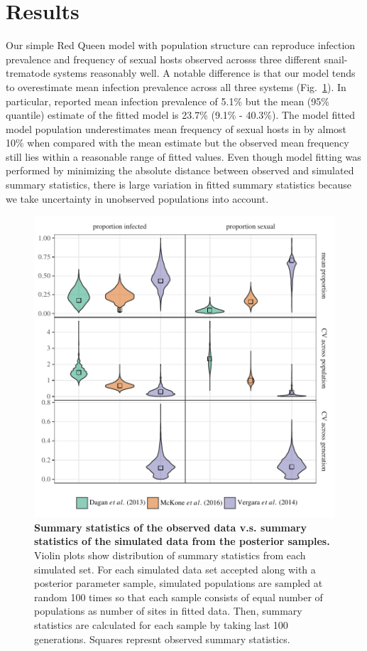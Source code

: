 \documentclass{article}\usepackage[]{graphicx}\usepackage[]{color}
\newcommand{\fref}[1]{Fig.~\ref{fig:#1}}
\begin{document}
\section{Results}

Our simple Red Queen model with population structure can reproduce infection prevalence and frequency of sexual hosts observed acrosss three different snail-trematode systems reasonably well.
A notable difference is that our model tends to overestimate mean infection prevalence across all three systems (\fref{smcsumm}).
In particular, \cite{mckone2016fine} reported mean infection prevalence of 5.1\% but the mean (95\% quantile) estimate of the fitted model is 23.7\% (9.1\% - 40.3\%).
The model fitted model \cite{vergara2014infection} population underestimates mean frequency of sexual hosts in by almost 10\% when compared with the mean estimate but the observed mean frequency still lies within a reasonable range of fitted values.
Even though model fitting was performed by minimizing the absolute distance between observed and simulated summary statistics, there is large variation in fitted summary statistics because we take uncertainty in unobserved populations into account.

\begin{figure}[!ht]
\includegraphics[width=\textwidth]{../fig/smc_summary.pdf}
\caption{{\bf Summary statistics of the observed data v.s. summary statistics of the simulated data from the posterior samples.}
Violin plots show distribution of summary statistics from each simulated set. For each simulated data set accepted along with a posterior parameter sample, simulated populations are sampled at random 100 times so that each sample consists of equal number of populations as number of sites in fitted data. Then, summary statistics are calculated for each sample by taking last 100 generations. Squares represnt observed summary statistics.
}
\label{fig:smcsumm}
\end{figure}
\end{document}
